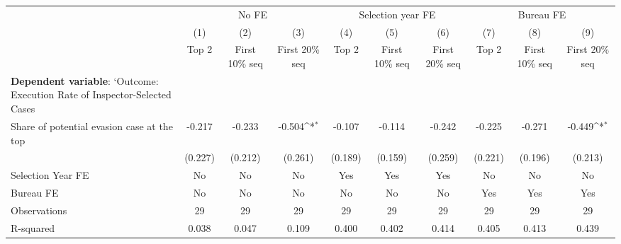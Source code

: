 {
\def\sym#1{\ifmmode^{#1}\else\(^{#1}\)\fi}
\begin{tabular}{l*{9}{c}}
\toprule
            &\multicolumn{3}{c}{No FE}                                        &\multicolumn{3}{c}{Selection year FE}                            &\multicolumn{3}{c}{Bureau FE}                                    \\\cmidrule(lr){2-4}\cmidrule(lr){5-7}\cmidrule(lr){8-10}
            &\multicolumn{1}{c}{(1)}&\multicolumn{1}{c}{(2)}&\multicolumn{1}{c}{(3)}&\multicolumn{1}{c}{(4)}&\multicolumn{1}{c}{(5)}&\multicolumn{1}{c}{(6)}&\multicolumn{1}{c}{(7)}&\multicolumn{1}{c}{(8)}&\multicolumn{1}{c}{(9)}\\
            &\multicolumn{1}{c}{Top 2}&\multicolumn{1}{c}{First 10\% seq}&\multicolumn{1}{c}{First 20\% seq}&\multicolumn{1}{c}{Top 2}&\multicolumn{1}{c}{First 10\% seq}&\multicolumn{1}{c}{First 20\% seq}&\multicolumn{1}{c}{Top 2}&\multicolumn{1}{c}{First 10\% seq}&\multicolumn{1}{c}{First 20\% seq}\\
\midrule
\textbf{Dependent variable}: `Outcome: Execution Rate of Inspector-Selected Cases&                     &                     &                     &                     &                     &                     &                     &                     &                     \\
\addlinespace
Share of potential evasion case at the top&      -0.217         &      -0.233         &      -0.504\sym{*}  &      -0.107         &      -0.114         &      -0.242         &      -0.225         &      -0.271         &      -0.449\sym{*}  \\
            &     (0.227)         &     (0.212)         &     (0.261)         &     (0.189)         &     (0.159)         &     (0.259)         &     (0.221)         &     (0.196)         &     (0.213)         \\
\midrule
Selection Year FE&          No         &          No         &          No         &         Yes         &         Yes         &         Yes         &          No         &          No         &          No         \\
Bureau FE   &          No         &          No         &          No         &          No         &          No         &          No         &         Yes         &         Yes         &         Yes         \\
Observations&          29         &          29         &          29         &          29         &          29         &          29         &          29         &          29         &          29         \\
R-squared   &       0.038         &       0.047         &       0.109         &       0.400         &       0.402         &       0.414         &       0.405         &       0.413         &       0.439         \\
\bottomrule
\end{tabular}
}
